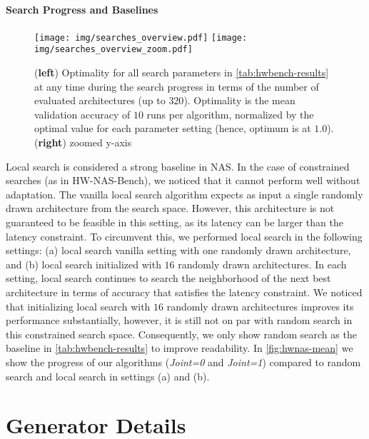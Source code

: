 \documentclass[runningheads]{llncs}
\begin{document}
\paragraph{Search Progress and Baselines}
\begin{figure}[h]
	\centering
	\texttt{[image: img/searches\_overview.pdf]}
	\texttt{[image: img/searches\_overview\_zoom.pdf]}
	
	\caption{(\textbf{left})
		Optimality for all search parameters in \autoref{tab:hwbench-results} at any time during the search progress in terms of the number of evaluated architectures (up to $320$).
		Optimality is the mean validation accuracy of $10$ runs per algorithm, normalized by the optimal value for each parameter setting (hence, optimum is at $1.0$). (\textbf{right}) zoomed y-axis
	}
	\label{fig:hwnas-mean}\label{fig:hwnas-mean-zoom}
\end{figure}
Local search \cite{2020LocalSearchNAS} is considered a strong baseline in NAS.
In the case of constrained searches (as in HW-NAS-Bench), we noticed that it cannot perform well without adaptation.
The vanilla local search algorithm expects as input a single randomly drawn architecture from the search space.
However, this architecture is not guaranteed to be feasible in this setting, as its latency can be larger than the latency constraint.
To circumvent this, we performed local search in the following settings: (a) local search vanilla setting with one randomly drawn architecture, and (b) local search initialized with $16$ randomly drawn architectures.
In each setting, local search continues to search the neighborhood of the next best architecture in terms of accuracy that satisfies the latency constraint.
We noticed that initializing local search with $16$ randomly drawn architectures improves its performance substantially, however, it is still not on par with random search \cite{2019RS} in this constrained search space.
Consequently, we only show random search as the baseline in \autoref{tab:hwbench-results} to improve readability.
In \autoref{fig:hwnas-mean} we show the progress of our algorithms (\emph{Joint=0} and \emph{Joint=1}) compared to random search and local search in settings (a) and (b).


\section{Generator Details}\label{sec:generator}\label{supp:sec_generator_ability}
\end{document}
